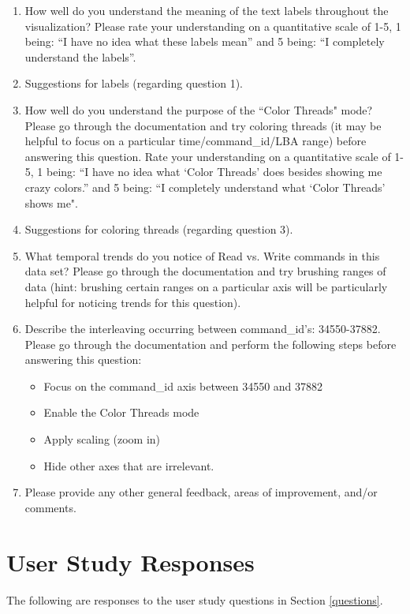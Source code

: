 \documentclass[12pt]{ucthesis}
\begin{document}
\begin{enumerate}
\item How well do you understand the meaning of the text labels throughout the visualization? Please rate your understanding on a quantitative scale of 1-5, 1 being: ``I have no idea what these labels mean'' and 5 being: ``I completely understand the labels''.

\item Suggestions for labels (regarding question 1).

\item How well do you understand the purpose of the ``Color Threads" mode? Please go through the documentation and try coloring threads (it may be helpful to focus on a particular time/command\_id/LBA range) before answering this question. Rate your understanding on a quantitative scale of 1-5, 1 being: ``I have no idea what `Color Threads' does besides showing me crazy colors.'' and 5 being: ``I completely understand what `Color Threads' shows me".

\item Suggestions for coloring threads (regarding question 3).

\item What temporal trends do you notice of Read vs. Write commands in this data set? Please go through the documentation and try brushing ranges of data (hint: brushing certain ranges on a particular axis will be particularly helpful for noticing trends for this question).

\item Describe the interleaving occurring between command\_id's: 34550-37882. Please go through the documentation and perform the following steps before answering this question: 
\begin{itemize}
\item Focus on the command\_id axis between 34550 and 37882 
\item Enable the Color Threads mode 
\item Apply scaling (zoom in)
\item Hide other axes that are irrelevant.
\end{itemize}

\item Please provide any other general feedback, areas of improvement, and/or comments.

\end{enumerate}

\section{User Study Responses}
The following are responses to the user study questions in Section \ref{questions}.
\end{document}
